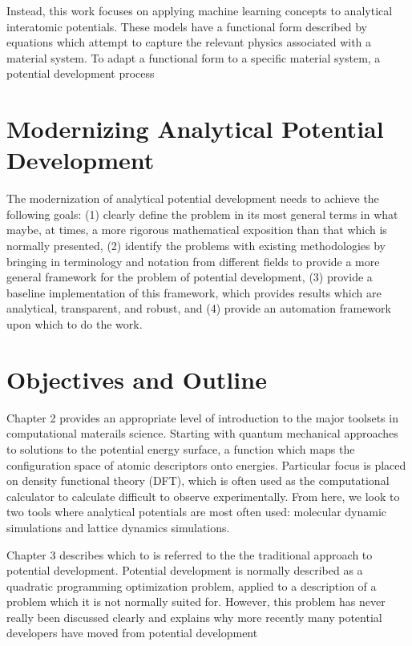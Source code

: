 Instead, this work focuses on applying machine learning concepts to analytical interatomic potentials.  These models have a functional form described by equations which attempt to capture the relevant physics associated with a material system.  To adapt a functional form to a specific material system, a potential development process

\section{Modernizing Analytical Potential Development}

The modernization of analytical potential development needs to achieve the following goals: 
(1) clearly define the problem in its most general terms in what maybe, at times, a more rigorous mathematical exposition than that which is normally presented, 
(2) identify the problems with existing methodologies by bringing in terminology and notation from different fields to provide a more general framework for the problem of potential development, 
(3) provide a baseline implementation of this framework, which provides results which are analytical, transparent, and robust, and 
(4) provide an automation framework upon which to do the work.

\section{Objectives and Outline}
Chapter 2 provides an appropriate level of introduction to the major toolsets in computational materails science.
Starting with quantum mechanical approaches to solutions to the potential energy surface, a function which maps the configuration space of atomic descriptors onto energies.
Particular focus is placed on density functional theory (DFT), which is often used as the computational calculator to calculate difficult to observe experimentally.
From here, we look to two tools where analytical potentials are most often used:  molecular dynamic simulations and lattice dynamics simulations.  

Chapter 3 describes which to is referred to the the traditional approach to potential development.  Potential development is normally described as a quadratic programming optimization problem, applied to a description of a problem which it is not normally suited for.  However, this problem has never really been discussed clearly and explains why more recently many potential developers have moved from potential development

